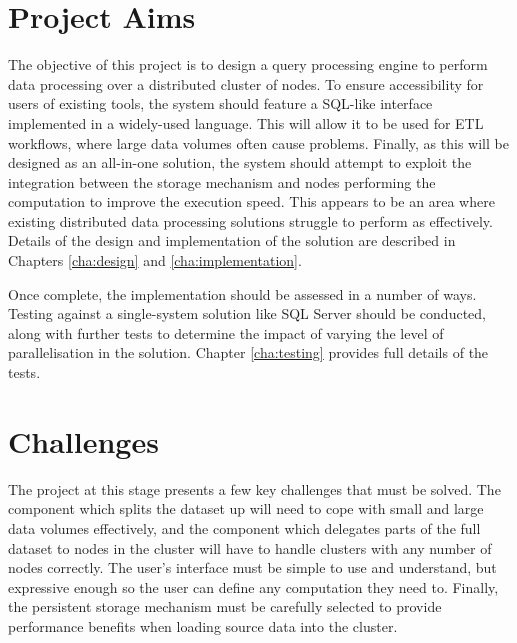 \section{Project Aims}
The objective of this project is to design a query processing engine to perform data processing over a distributed cluster of nodes. To ensure accessibility for users of existing tools, the system should feature a SQL-like interface implemented in a widely-used language. This will allow it to be used for ETL workflows, where large data volumes often cause problems. Finally, as this will be designed as an all-in-one solution, the system should attempt to exploit the integration between the storage mechanism and nodes performing the computation to improve the execution speed. This appears to be an area where existing distributed data processing solutions struggle to perform as effectively. Details of the design and implementation of the solution are described in Chapters \ref{cha:design} and \ref{cha:implementation}.

Once complete, the implementation should be assessed in a number of ways. Testing against a single-system solution like SQL Server should be conducted, along with further tests to determine the impact of varying the level of parallelisation in the solution. Chapter \ref{cha:testing} provides full details of the tests.

\section{Challenges}
The project at this stage presents a few key challenges that must be solved. The component which splits the dataset up will need to cope with small and large data volumes effectively, and the component which delegates parts of the full dataset to nodes in the cluster will have to handle clusters with any number of nodes correctly. The user's interface must be simple to use and understand, but expressive enough so the user can define any computation they need to. Finally, the persistent storage mechanism must be carefully selected to provide performance benefits when loading source data into the cluster.
